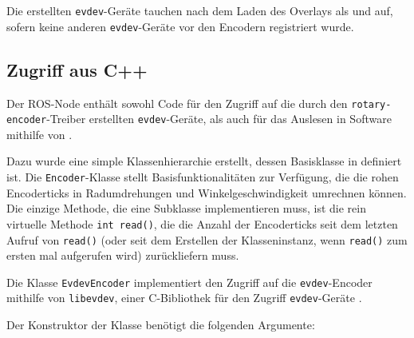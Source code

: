 \documentclass[german]{thesis_KBS}
\newcommand{\code}[1]{\texttt{#1}}  %
\begin{document}
Die erstellten \code{evdev}-Geräte tauchen nach dem Laden des Overlays als
 und  auf, sofern keine anderen
\code{evdev}-Geräte vor den Encodern registriert wurde.



\subsection{Zugriff aus C++}

Der ROS-Node enthält sowohl Code für den Zugriff auf die durch den
\code{rotary-encoder}-Treiber erstellten \code{evdev}-Geräte, als auch für das
Auslesen in Software mithilfe von \pigpio{}.

Dazu wurde eine simple Klassenhierarchie erstellt, dessen Basisklasse in
 definiert ist. Die \code{Encoder}-Klasse stellt
Basisfunktionalitäten zur Verfügung, die die rohen Encoderticks in
Radumdrehungen und Winkelgeschwindigkeit umrechnen können. Die einzige Methode,
die eine Subklasse implementieren muss, ist die rein virtuelle Methode \code{int
read()}, die die Anzahl der Encoderticks seit dem letzten Aufruf von
\code{read()} (oder seit dem Erstellen der Klasseninstanz, wenn \code{read()}
zum ersten mal aufgerufen wird) zurückliefern muss.

Die Klasse \code{EvdevEncoder} implementiert den Zugriff auf die
\code{evdev}-Encoder mithilfe von \code{libevdev}, einer C-Bibliothek für den
Zugriff \code{evdev}-Geräte \cite{libevdev}.

Der Konstruktor der Klasse benötigt die folgenden Argumente:
\end{document}
